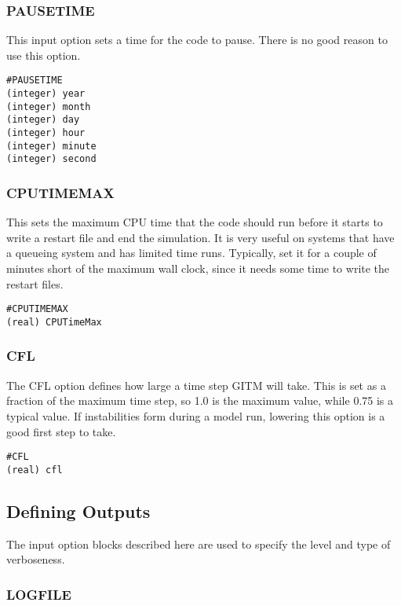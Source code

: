 \subsubsection{PAUSETIME}
\label{pausetime.sec}

This input option sets a time for the code to pause.  There is no good reason to use this option.

\begin{verbatim}
#PAUSETIME
(integer) year
(integer) month 
(integer) day 
(integer) hour 
(integer) minute 
(integer) second
\end{verbatim}

\subsubsection{CPUTIMEMAX}
\label{cputimemax.sec}

This sets the maximum CPU time that the code should run before it starts to write a restart file and end the simulation.  It is very useful on systems that have a queueing system and has limited time runs.  Typically, set it for a couple of minutes short of the maximum wall clock, since it needs some time to write the restart files.

\begin{verbatim}
#CPUTIMEMAX
(real) CPUTimeMax
\end{verbatim}

\subsubsection{CFL}
\label{cfl.sec}

The CFL option defines how large a time step GITM will take.  This is set as a fraction of the maximum time step, so 1.0 is the maximum value, while 0.75 is a typical value.  If instabilities form during a model run, lowering this option is a good first step to take.

\begin{verbatim}
#CFL
(real) cfl
\end{verbatim}

\subsection{Defining Outputs}
\label{def_out.sec}

The input option blocks described here are used to specify the level and type of verboseness. 

\subsubsection{LOGFILE}
\label{logfile.sec}

